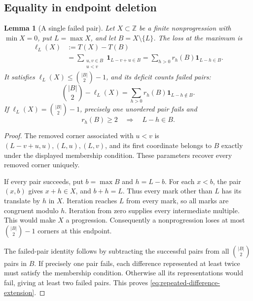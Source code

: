 \documentclass[11pt,a4paper]{article}
\newtheorem{lemma}[theorem]{Lemma}
\theoremstyle{definition}
\newcommand{\Z}{\mathbb Z}
\newcommand{\ind}{\mathbf1}
\numberwithin{equation}{section}
\begin{document}
\subsection{Equality in endpoint deletion}
\begin{lemma}[A single failed pair]\label{lem:endpoint-equality}
Let $X\subset\Z$ be a finite nonprogression with $\min X=0$, put $L=\max X$,
and let $B=X\setminus\{L\}$. The loss at the maximum is
\begin{equation}\label{eq:endpoint-equality-loss}
\begin{split}
\ell_L(X)&:=T(X)-T(B)\\
&=\sum_{\substack{u,v\in B\\u<v}}\ind_{L-v+u\in B}
=\sum_{h>0}r_h(B)\ind_{L-h\in B}.
\end{split}
\end{equation}
It satisfies $\ell_L(X)\le\binom{|B|}{2}-1$, and its deficit counts failed pairs:
\begin{equation}\label{eq:failed-endpoint-pairs}
\binom{|B|}{2}-\ell_L(X)
=\sum_{h>0}r_h(B)\ind_{L-h\notin B}.
\end{equation}
If $\ell_L(X)=\binom{|B|}{2}-1$, precisely one unordered pair fails and
\begin{equation}\label{eq:repeated-difference-extension}
r_h(B)\ge2\quad\Longrightarrow\quad L-h\in B.
\end{equation}
\end{lemma}
\begin{proof}
The removed corner associated with $u<v$ is
$(L-v+u,u),(L,u),(L,v)$, and its first coordinate belongs to $B$ exactly under the displayed membership condition. These parameters recover every removed corner uniquely.

If every pair succeeds, put $b=\max B$ and $h=L-b$. For each $x<b$, the pair $(x,b)$ gives $x+h\in X$, and $b+h=L$. Thus every mark other than $L$ has its translate by $h$ in $X$. Iteration reaches $L$ from every mark, so all marks are congruent modulo $h$. Iteration from zero supplies every intermediate multiple. This would make $X$ a progression. Consequently a nonprogression loses at most
\(\binom{|B|}{2}-1\) corners at this endpoint.

The failed-pair identity follows by subtracting the successful pairs from all
\(\binom{|B|}{2}\) pairs in \(B\). If precisely one pair fails, each difference
represented at least twice must satisfy the membership condition. Otherwise
all its representations would fail, giving at least two failed pairs.
This proves \eqref{eq:repeated-difference-extension}.
\end{proof}
\end{document}
